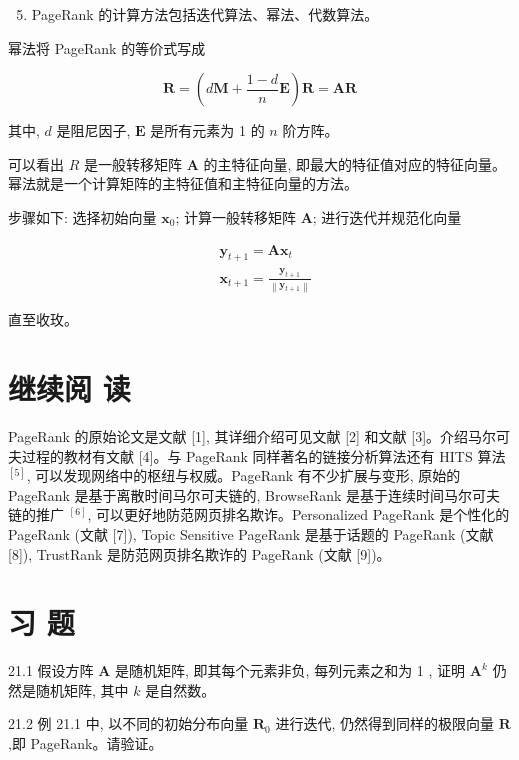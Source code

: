 \documentclass[10pt]{article}
\begin{document}
\begin{CJK*}{UTF8}{bsmi}
\begin{enumerate}
  \setcounter{enumi}{4}
  \item PageRank 的计算方法包括迭代算法、幂法、代数算法。
\end{enumerate}

幂法将 PageRank 的等价式写成

$$
\boldsymbol{R}=\left(d \boldsymbol{M}+\frac{1-d}{n} \boldsymbol{E}\right) \boldsymbol{R}=\boldsymbol{A} \boldsymbol{R}
$$

其中, $d$ 是阻尼因子, $\boldsymbol{E}$ 是所有元素为 1 的 $n$ 阶方阵。

可以看出 $R$ 是一般转移矩阵 $\boldsymbol{A}$ 的主特征向量, 即最大的特征值对应的特征向量。幂法就是一个计算矩阵的主特征值和主特征向量的方法。

步骤如下: 选择初始向量 $\boldsymbol{x}_{0}$; 计算一般转移矩阵 $\boldsymbol{A}$; 进行迭代并规范化向量

$$
\begin{aligned}
& \boldsymbol{y}_{t+1}=\boldsymbol{A} \boldsymbol{x}_{t} \\
& \boldsymbol{x}_{t+1}=\frac{\boldsymbol{y}_{t+1}}{\left\|\boldsymbol{y}_{t+1}\right\|}
\end{aligned}
$$

直至收玫。

\section*{继续阅 读}
PageRank 的原始论文是文献 [1], 其详细介绍可见文献 [2] 和文献 [3]。介绍马尔可夫过程的教材有文献 [4]。与 PageRank 同样著名的链接分析算法还有 HITS 算法 ${ }^{[5]}$, 可以发现网络中的枢纽与权威。PageRank 有不少扩展与变形, 原始的 PageRank 是基于离散时间马尔可夫链的, BrowseRank 是基于连续时间马尔可夫链的推广 ${ }^{[6]}$, 可以更好地防范网页排名欺诈。Personalized PageRank 是个性化的 PageRank (文献 [7]), Topic Sensitive PageRank 是基于话题的 PageRank (文献 [8]), TrustRank 是防范网页排名欺诈的 PageRank (文献 [9])。

\section*{习 题}
21.1 假设方阵 $\boldsymbol{A}$ 是随机矩阵, 即其每个元素非负, 每列元素之和为 1 , 证明 $\boldsymbol{A}^{k}$ 仍然是随机矩阵, 其中 $k$ 是自然数。

21.2 例 21.1 中, 以不同的初始分布向量 $\boldsymbol{R}_{0}$ 进行迭代, 仍然得到同样的极限向量 $\boldsymbol{R}$,即 PageRank。请验证。


\end{CJK*}
\end{document}
